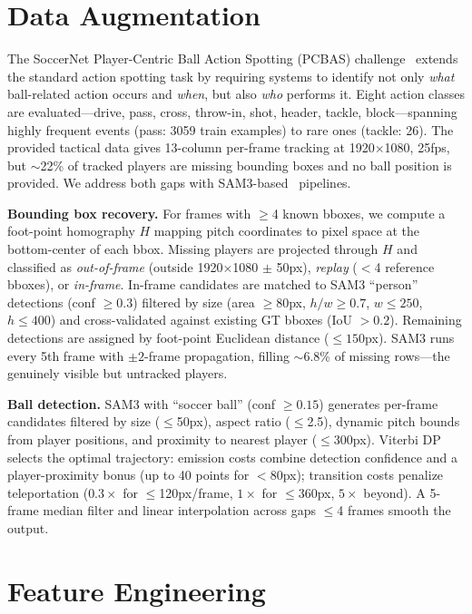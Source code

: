 \section{Data Augmentation}
\label{sec:data}

The SoccerNet Player-Centric Ball Action Spotting (PCBAS) challenge~\cite{deliege2021soccernet,cioppa2024soccernet} extends the standard action spotting task by requiring systems to identify not only \emph{what} ball-related action occurs and \emph{when}, but also \emph{who} performs it. Eight action classes are evaluated---drive, pass, cross, throw-in, shot, header, tackle, block---spanning highly frequent events (pass: 3059 train examples) to rare ones (tackle: 26). The provided tactical data gives 13-column per-frame tracking at 1920$\times$1080, 25fps, but $\sim$22\% of tracked players are missing bounding boxes and no ball position is provided. We address both gaps with SAM3-based~\cite{ravi2024sam2} pipelines.

\noindent\textbf{Bounding box recovery.}
For frames with $\geq$4 known bboxes, we compute a foot-point homography $H$ mapping pitch coordinates to pixel space at the bottom-center of each bbox. Missing players are projected through $H$ and classified as \emph{out-of-frame} (outside 1920$\times$1080 $\pm$ 50px), \emph{replay} ($<$4 reference bboxes), or \emph{in-frame}. In-frame candidates are matched to SAM3 ``person'' detections (conf $\geq 0.3$) filtered by size (area $\geq 80$px, $h/w \geq 0.7$, $w \leq 250$, $h \leq 400$) and cross-validated against existing GT bboxes (IoU $> 0.2$). Remaining detections are assigned by foot-point Euclidean distance ($\leq 150$px). SAM3 runs every 5th frame with $\pm 2$-frame propagation, filling $\sim$6.8\% of missing rows---the genuinely visible but untracked players.

\noindent\textbf{Ball detection.}
SAM3 with ``soccer ball'' (conf $\geq 0.15$) generates per-frame candidates filtered by size ($\leq$50px), aspect ratio ($\leq$2.5), dynamic pitch bounds from player positions, and proximity to nearest player ($\leq$300px). Viterbi DP selects the optimal trajectory: emission costs combine detection confidence and a player-proximity bonus (up to 40 points for $<$80px); transition costs penalize teleportation ($0.3\times$ for $\leq$120px/frame, $1\times$ for $\leq$360px, $5\times$ beyond). A 5-frame median filter and linear interpolation across gaps $\leq$4 frames smooth the output.

\section{Feature Engineering}
\label{sec:features}

